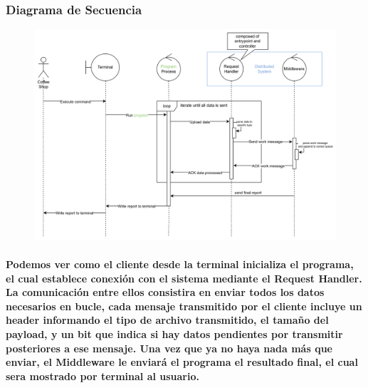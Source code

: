 \documentclass[titlepage,a4paper]{article}
\begin{document}
\subsubsection{Diagrama de Secuencia}

\begin{figure}[H]
    \centering
    \includegraphics[width=0.8\linewidth]{secuencia.png}
\end{figure}
\paragraph{Podemos ver como el cliente desde la terminal inicializa el programa, el cual establece conexión con el sistema mediante el Request Handler. La comunicación entre ellos consistira en enviar todos los datos necesarios en bucle, cada mensaje transmitido por el cliente incluye un header informando el tipo de archivo transmitido, el tamaño del payload, y un bit que indica si hay datos pendientes por transmitir posteriores a ese mensaje. Una vez que ya no haya nada más que enviar, el Middleware le enviará el programa el resultado final, el cual sera mostrado por terminal al usuario.}
\end{document}
